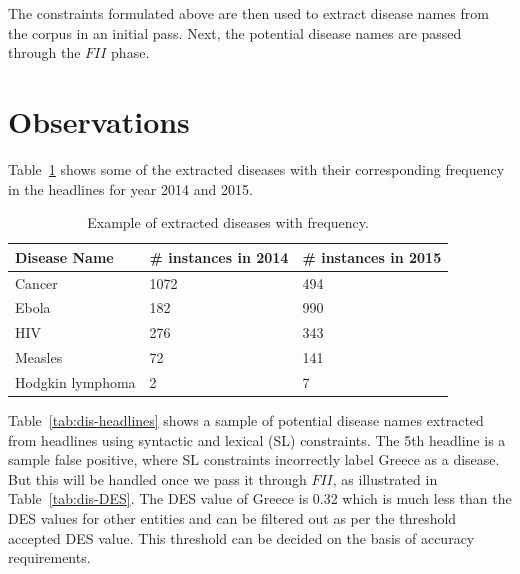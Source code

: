 \documentclass{article}
\begin{document}
The constraints formulated above are then used to extract disease names from the corpus in an initial pass. Next, the potential disease names are passed through the $FII$ phase.

\section{Observations}

Table~\ref{tab:dis-freq} shows some of the extracted diseases with their corresponding frequency in the headlines for year 2014 and 2015. 

\begin{table}[h]
  \caption{Example of extracted diseases with frequency.}
  \centering
  \begin{tabular}{|l|l|l|} \hline
  \label{tab:dis-freq}
  \textbf{Disease Name} & \textbf{\# instances in 2014} & \textbf{\# instances in 2015}\\ \hline
  Cancer & 1072 & 494 \\ \hline
  Ebola & 182 & 990 \\ \hline
  HIV & 276 & 343 \\ \hline
  Measles & 72 & 141 \\ \hline
  Hodgkin lymphoma & 2 & 7 \\ \hline
  
  \end{tabular}
\end{table}


Table~\ref{tab:dis-headlines} shows a sample of potential disease names extracted from  headlines using syntactic and lexical (SL) constraints. The 5th headline is a sample false positive, where SL constraints incorrectly label Greece as a disease. But this will be handled once we pass it through $FII$, as illustrated in Table~\ref{tab:dis-DES}. The DES value of Greece is 0.32 which is much less than the DES values for other entities and can be filtered out as per the threshold accepted DES value. This threshold can be decided on the basis of accuracy requirements.  \\ 
\\
\end{document}
